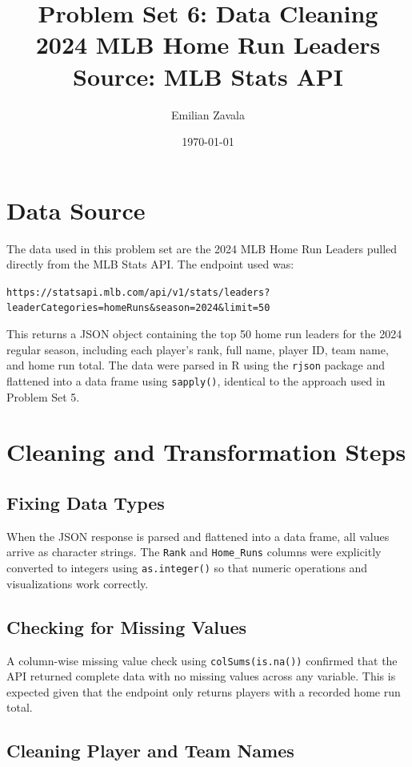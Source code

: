 \documentclass[12pt]{article}
\title{Problem Set 6: Data Cleaning\\
       \large 2024 MLB Home Run Leaders\\
       \normalsize Source: MLB Stats API}
\author{Emilian Zavala}
\date{\today}
\begin{document}
\maketitle

\section{Data Source}
 
The data used in this problem set are the 2024 MLB Home Run Leaders pulled directly from the MLB Stats API. The endpoint used was:
 
\begin{center}
\small\texttt{https://statsapi.mlb.com/api/v1/stats/leaders?leaderCategories=homeRuns\&season=2024\&limit=50}
\end{center}
 
This returns a JSON object containing the top 50 home run leaders for the 2024 regular season, including each player's rank, full name, player ID, team name, and home run total. The data were parsed in R using the \texttt{rjson} package and flattened into a data frame using \texttt{sapply()}, identical to the approach used in Problem Set 5.

\section{Cleaning and Transformation Steps}
 
\subsection{Fixing Data Types}
 
When the JSON response is parsed and flattened into a data frame, all values arrive as character strings. The \texttt{Rank} and
\texttt{Home\_Runs} columns were explicitly converted to integers using \texttt{as.integer()} so that numeric operations and visualizations work correctly.
 
\subsection{Checking for Missing Values}
 
A column-wise missing value check using \texttt{colSums(is.na())} confirmed that the API returned complete data with no missing values across any variable. This is expected given that the endpoint only returns players with a recorded home run total.
 
\subsection{Cleaning Player and Team Names}
 
\end{document}
